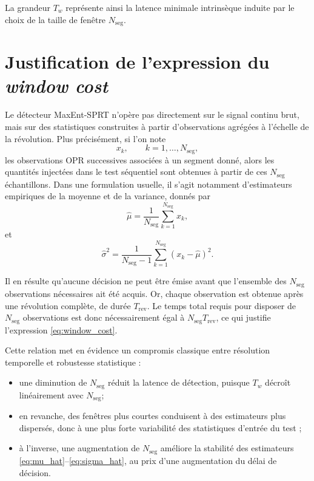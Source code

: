 \documentclass[12pt,a4paper, openany]{book}
\begin{document}
La grandeur $T_w$ représente ainsi la latence minimale intrinsèque induite par le choix de la taille de fenêtre $N_{\mathrm{seg}}$.

\section{Justification de l'expression du \textit{window cost}}

Le détecteur MaxEnt-SPRT n'opère pas directement sur le signal continu brut, mais sur des statistiques construites à partir d'observations agrégées à l'échelle de la révolution. Plus précisément, si l'on note
\begin{equation}
x_k, \qquad k = 1,\dots,N_{\mathrm{seg}},
\end{equation}
les observations OPR successives associées à un segment donné, alors les quantités injectées dans le test séquentiel sont obtenues à partir de ces $N_{\mathrm{seg}}$ échantillons. Dans une formulation usuelle, il s'agit notamment d'estimateurs empiriques de la moyenne et de la variance, donnés par
\begin{equation}
\widehat{\mu}
=
\frac{1}{N_{\mathrm{seg}}}
\sum_{k=1}^{N_{\mathrm{seg}}} x_k,
\label{eq:mu_hat}
\end{equation}
et
\begin{equation}
\widehat{\sigma}^{2}
=
\frac{1}{N_{\mathrm{seg}}-1}
\sum_{k=1}^{N_{\mathrm{seg}}}
\left(x_k - \widehat{\mu}\right)^2.
\label{eq:sigma_hat}
\end{equation}

Il en résulte qu'aucune décision ne peut être émise avant que l'ensemble des $N_{\mathrm{seg}}$ observations nécessaires ait été acquis. Or, chaque observation est obtenue après une révolution complète, de durée $T_{\mathrm{rev}}$. Le temps total requis pour disposer de $N_{\mathrm{seg}}$ observations est donc nécessairement égal à $N_{\mathrm{seg}}T_{\mathrm{rev}}$, ce qui justifie l'expression \eqref{eq:window_cost}.
\medskip

Cette relation met en évidence un compromis classique entre résolution temporelle et robustesse statistique :
\begin{itemize}
    \item une diminution de $N_{\mathrm{seg}}$ réduit la latence de détection, puisque $T_w$ décroît linéairement avec $N_{\mathrm{seg}}$;
    \item en revanche, des fenêtres plus courtes conduisent à des estimateurs plus dispersés, donc à une plus forte variabilité des statistiques d'entrée du test ;
    \item à l'inverse, une augmentation de $N_{\mathrm{seg}}$ améliore la stabilité des estimateurs \eqref{eq:mu_hat}--\eqref{eq:sigma_hat}, au prix d'une augmentation du délai de décision.
\end{itemize}
\end{document}
